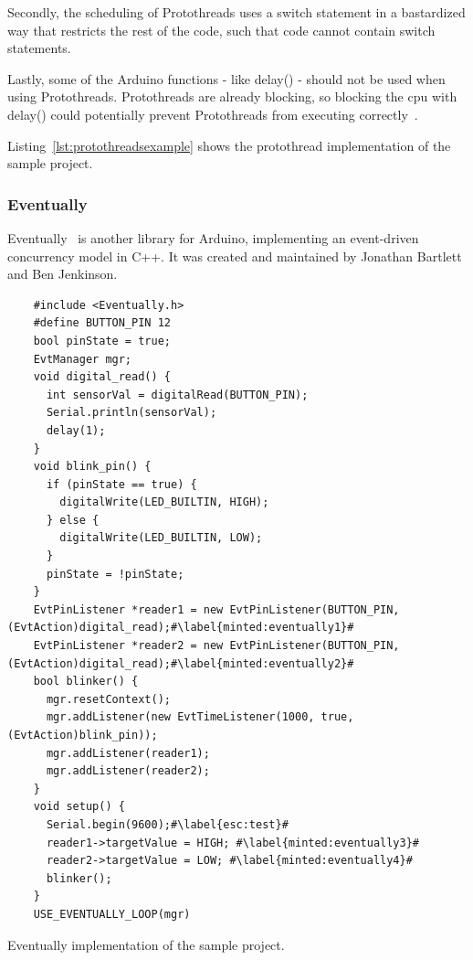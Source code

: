 Secondly, the scheduling of Protothreads uses a switch statement in a bastardized way that restricts the rest of the code, such that code cannot contain switch statements.

Lastly, some of the Arduino functions - like delay() - should not be used when using Protothreads. Protothreads are already blocking, so blocking the \gls{cpu} with delay() could potentially prevent Protothreads from executing correctly~\cite{AdamDunkelProtothreads}.

Listing~\ref{lst:protothreadsexample} shows the protothread implementation of the sample project.


\subsubsection{Eventually}
Eventually~\cite{bartlettEventually2022Bartlett} is another library for Arduino, implementing an event-driven concurrency model in C++. It was created and maintained by Jonathan Bartlett and Ben Jenkinson.


\begin{listing}[htb!]
  \begin{verbatim}
    #include <Eventually.h>
    #define BUTTON_PIN 12
    bool pinState = true;
    EvtManager mgr;
    void digital_read() {
      int sensorVal = digitalRead(BUTTON_PIN);
      Serial.println(sensorVal);
      delay(1);
    }
    void blink_pin() {
      if (pinState == true) {
        digitalWrite(LED_BUILTIN, HIGH);
      } else {
        digitalWrite(LED_BUILTIN, LOW);
      }
      pinState = !pinState;
    }
    EvtPinListener *reader1 = new EvtPinListener(BUTTON_PIN, (EvtAction)digital_read);#\label{minted:eventually1}#
    EvtPinListener *reader2 = new EvtPinListener(BUTTON_PIN, (EvtAction)digital_read);#\label{minted:eventually2}#
    bool blinker() {
      mgr.resetContext();
      mgr.addListener(new EvtTimeListener(1000, true, (EvtAction)blink_pin));
      mgr.addListener(reader1);
      mgr.addListener(reader2);
    }
    void setup() {
      Serial.begin(9600);#\label{esc:test}#
      reader1->targetValue = HIGH; #\label{minted:eventually3}#
      reader2->targetValue = LOW; #\label{minted:eventually4}#
      blinker();
    }
    USE_EVENTUALLY_LOOP(mgr)
  \end{verbatim}
  \caption{Eventually implementation of the sample project.}
  \label{lst:eventuallyexample}
\end{listing}


